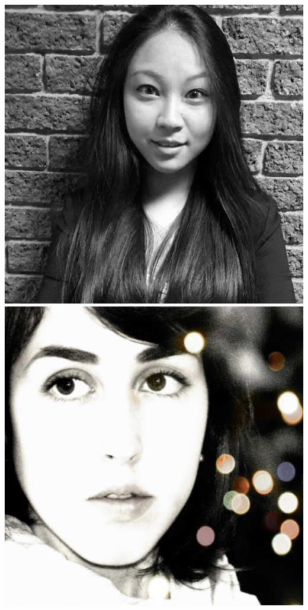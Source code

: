 \begin{center}
\begin{tabular}{r|c|l}
	 	\end{tabular}
	 	\vspace{.5em}\newline
	 	\includegraphics[width=.35\textheight]{gfx/zilithumbsmall.jpg}
	 	\includegraphics[width=.35\textheight]{gfx/saigethumb.jpg}

\end{center}
